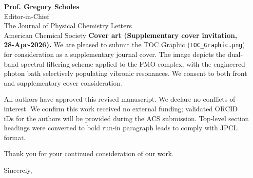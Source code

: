 \documentclass[11pt,a4paper]{letter}
\begin{document}
\begin{letter}{
\textbf{Prof. Gregory Scholes}\\
Editor-in-Chief\\
The Journal of Physical Chemistry Letters\\
American Chemical Society
}
\textbf{Cover art (Supplementary cover invitation, 28-Apr-2026).}
We are pleased to submit the TOC Graphic (\texttt{TOC\_Graphic.png}) for consideration as a supplementary journal cover. The image depicts the dual-band spectral filtering scheme applied to the FMO complex, with the engineered photon bath selectively populating vibronic resonances. We consent to both front and supplementary cover consideration.

All authors have approved this revised manuscript. We declare no conflicts of interest.
We confirm this work received no external funding; validated ORCID iDs for the authors will be provided during the ACS submission. Top-level section headings were converted to bold run-in paragraph leads to comply with JPCL format.

Thank you for your continued consideration of our work.

\closing{Sincerely,}


\end{letter}
\end{document}
